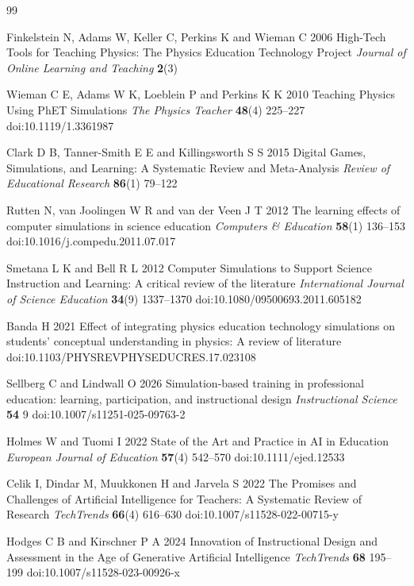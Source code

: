 \documentclass{iopjournal}
\begin{document}
\begin{thebibliography}{99}

Finkelstein N, Adams W, Keller C, Perkins K and Wieman C 2006 High-Tech Tools for Teaching Physics: The Physics Education Technology Project \textit{Journal of Online Learning and Teaching} \textbf{2}(3)

Wieman C E, Adams W K, Loeblein P and Perkins K K 2010 Teaching Physics Using PhET Simulations \textit{The Physics Teacher} \textbf{48}(4) 225--227 doi:10.1119/1.3361987

Clark D B, Tanner-Smith E E and Killingsworth S S 2015 Digital Games, Simulations, and Learning: A Systematic Review and Meta-Analysis \textit{Review of Educational Research} \textbf{86}(1) 79--122

Rutten N, van Joolingen W R and van der Veen J T 2012 The learning effects of computer simulations in science education \textit{Computers \& Education} \textbf{58}(1) 136--153 doi:10.1016/j.compedu.2011.07.017

Smetana L K and Bell R L 2012 Computer Simulations to Support Science Instruction and Learning: A critical review of the literature \textit{International Journal of Science Education} \textbf{34}(9) 1337--1370 doi:10.1080/09500693.2011.605182

Banda H 2021 Effect of integrating physics education technology simulations on students' conceptual understanding in physics: A review of literature doi:10.1103/PHYSREVPHYSEDUCRES.17.023108

Sellberg C and Lindwall O 2026 Simulation-based training in professional education: learning, participation, and instructional design \textit{Instructional Science} \textbf{54} 9 doi:10.1007/s11251-025-09763-2

Holmes W and Tuomi I 2022 State of the Art and Practice in AI in Education \textit{European Journal of Education} \textbf{57}(4) 542--570 doi:10.1111/ejed.12533

Celik I, Dindar M, Muukkonen H and Jarvela S 2022 The Promises and Challenges of Artificial Intelligence for Teachers: A Systematic Review of Research \textit{TechTrends} \textbf{66}(4) 616--630 doi:10.1007/s11528-022-00715-y

Hodges C B and Kirschner P A 2024 Innovation of Instructional Design and Assessment in the Age of Generative Artificial Intelligence \textit{TechTrends} \textbf{68} 195--199 doi:10.1007/s11528-023-00926-x


\end{thebibliography}
\end{document}
